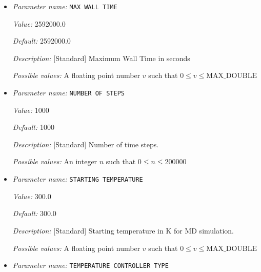 \begin{itemize}
{\it Value:} 1.5


{\it Default:} 1.5


{\it Description:} [Developer] Maximum scaling factor for maximum jacobian ratio of FEM mesh when mesh is deformed.


{\it Possible values:} A floating point number $v$ such that $0.9 \leq v \leq 3$
\item {\it Parameter name:} {\tt MAX WALL TIME}
\label{parameters:Molecular Dynamics/MAX WALL TIME}
\label{parameters:Molecular_20Dynamics/MAX_20WALL_20TIME}


{\it Value:} 2592000.0


{\it Default:} 2592000.0


{\it Description:} [Standard] Maximum Wall Time in seconds


{\it Possible values:} A floating point number $v$ such that $0 \leq v \leq \text{MAX\_DOUBLE}$
\item {\it Parameter name:} {\tt NUMBER OF STEPS}
\label{parameters:Molecular Dynamics/NUMBER OF STEPS}
\label{parameters:Molecular_20Dynamics/NUMBER_20OF_20STEPS}


{\it Value:} 1000


{\it Default:} 1000


{\it Description:} [Standard] Number of time steps.


{\it Possible values:} An integer $n$ such that $0\leq n \leq 200000$
\item {\it Parameter name:} {\tt STARTING TEMPERATURE}
\label{parameters:Molecular Dynamics/STARTING TEMPERATURE}
\label{parameters:Molecular_20Dynamics/STARTING_20TEMPERATURE}


{\it Value:} 300.0


{\it Default:} 300.0


{\it Description:} [Standard] Starting temperature in K for MD simulation.


{\it Possible values:} A floating point number $v$ such that $0 \leq v \leq \text{MAX\_DOUBLE}$
\item {\it Parameter name:} {\tt TEMPERATURE CONTROLLER TYPE}
\label{parameters:Molecular Dynamics/TEMPERATURE CONTROLLER TYPE}
\label{parameters:Molecular_20Dynamics/TEMPERATURE_20CONTROLLER_20TYPE}



\end{itemize}
